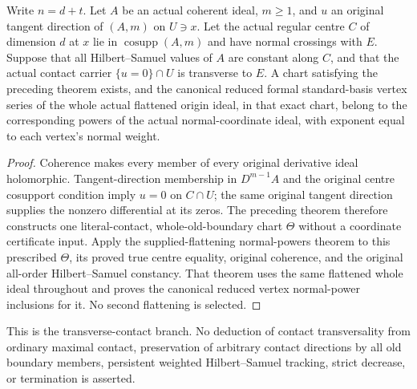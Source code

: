 \begin{theorem}
\label{thm:actual-boundary-contact-same-normal-powers}
\leanok
Write $n=d+t$.  Let $A$ be an actual coherent ideal, $m\ge1$, and $u$ an
original tangent direction of $(A,m)$ on $U\ni x$.  Let the actual regular
centre $C$ of dimension $d$ at $x$ lie in $\operatorname{cosupp}(A,m)$ and
have normal crossings with $E$.  Suppose that all Hilbert--Samuel values of
$A$ are constant along $C$, and that the actual contact carrier
$\{u=0\}\cap U$ is transverse to $E$.  A chart satisfying the preceding
theorem exists, and the canonical reduced formal standard-basis vertex
series of the whole actual flattened origin ideal, in that exact chart,
belong to the corresponding powers of the actual normal-coordinate ideal,
with exponent equal to each vertex's normal weight.
\end{theorem}
\begin{proof}
Coherence makes every member of every original derivative ideal
holomorphic.  Tangent-direction membership in $D^{m-1}A$ and the original
centre cosupport condition imply $u=0$ on $C\cap U$; the same original
tangent direction supplies the nonzero differential at its zeros.  The
preceding theorem therefore constructs one literal-contact,
whole-old-boundary chart $\Theta$ without a coordinate certificate input.
Apply the supplied-flattening normal-powers theorem to this prescribed
$\Theta$, its proved true centre equality, original coherence, and the
original all-order Hilbert--Samuel constancy.  That theorem uses the same
flattened whole ideal throughout and proves the canonical reduced vertex
normal-power inclusions for it.  No second flattening is selected.
\end{proof}

This is the transverse-contact branch.  No deduction of contact
transversality from ordinary maximal contact, preservation of arbitrary
contact directions by all old boundary members, persistent weighted
Hilbert--Samuel tracking, strict decrease, or termination is asserted.
